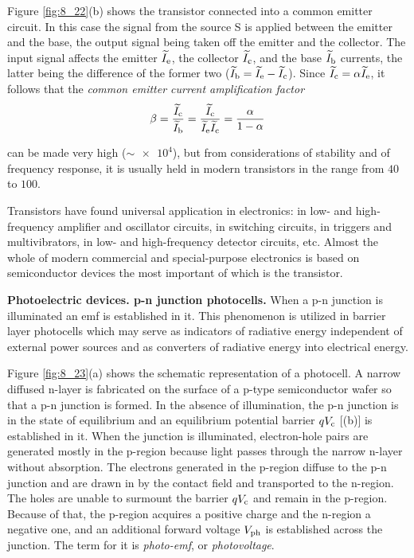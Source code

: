 Figure \ref{fig:8_22}(b) shows the transistor connected into a common emitter circuit. In this case the signal from the source S is applied between the emitter and the base, the output signal being taken off the emitter and the collector. The input signal affects the emitter $\widetilde{I}_{\text{e}}$, the collector $\widetilde{I}_{\text{c}}$, and the base $\widetilde{I}_{\text{b}}$ currents, the latter being the difference of the former two ($\widetilde{I}_{\text{b}}=\widetilde{I}_{\text{e}}-\widetilde{I}_{\text{c}}$).
Since $\widetilde{I}_{\text{c}}= \alpha\widetilde{I}_{\text{e}}$, it follows that the \textit{common emitter current amplification factor}
\begin{equation*}
	\beta = \frac{\widetilde{I}_{\text{c}}}{\widetilde{I}_{\text{b}}} = \frac{\widetilde{I}_{\text{c}}}{\widetilde{I}_{\text{e}}\widetilde{I}_{\text{c}}} = \frac{\alpha}{1 - \alpha}
\end{equation*}

\noindent
can be made very high ($\sim\num{e4}$), but from considerations of stability and of frequency response, it is usually held in modern transistors
in the range from $40$ to $100$.

Transistors have found universal application in electronics: in low- and high-frequency amplifier and oscillator circuits, in switching circuits, in triggers and multivibrators, in low- and high-frequency detector circuits, etc. Almost the whole of modern commercial and special-purpose electronics is based on semiconductor devices the most important of which is the transistor.

\textbf{Photoelectric devices. p-n junction photocells.} When a p-n junction is illuminated an emf is established in it. This phenomenon is utilized in barrier layer photocells which may serve as indicators of radiative energy independent of external power sources and as converters of radiative energy into electrical energy.

Figure \ref{fig:8_23}(a) shows the schematic representation of a photocell. A narrow diffused n-layer is fabricated on the surface of a p-type semiconductor wafer so that a p-n junction is formed. In the absence of illumination, the p-n junction is in the state of equilibrium and an equilibrium potential barrier $qV_{\text{c}}$ [(b)] is established in it. When the junction is illuminated, electron-hole pairs are generated mostly in the p-region because light passes through the narrow n-layer without absorption. The electrons generated in the p-region diffuse to the p-n junction and are drawn in by the contact field and transported to the n-region. The holes are unable to surmount the barrier $qV_{\text{c}}$ and remain in the p-region. Because of that, the p-region acquires a positive charge and the n-region a negative one, and an additional forward voltage $V_{\text{ph}}$ is established across the junction. The term for it is \textit{photo-emf}, or \textit{photovoltage}.

